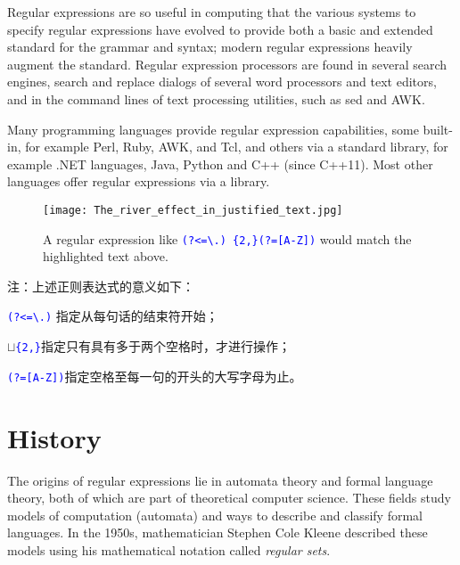 Regular expressions are so useful in computing that the various systems to specify regular expressions have evolved to provide both a basic and extended standard for the grammar and syntax; modern regular expressions heavily augment the standard. Regular expression processors are found in several search engines, search and replace dialogs of several word processors and text editors, and in the command lines of text processing utilities, such as sed and AWK.

Many programming languages provide regular expression capabilities, some built-in, for example Perl, Ruby, AWK, and Tcl, and others via a standard library, for example .NET languages, Java, Python and C++ (since C++11). Most other languages offer regular expressions via a library.


\begin{figure}[!ht]
\centering
\texttt{[image: The\_river\_effect\_in\_justified\_text.jpg]}
\vspace{-20pt}
\caption{\small{A regular expression like \textcolor{Blue}{\texttt{(?<=\textbackslash.) \{2,\}(?=[A-Z])}} would match the highlighted text above.}}
\label{regexp_example}
\end{figure}

注：上述正则表达式的意义如下：

\begin{compactenum}
\item \textcolor{Blue}{\texttt{(?<=\textbackslash.)}} 指定从每句话的结束符开始；
\item $\sqcup$\textcolor{Blue}{\texttt{\{2,\}}}指定只有具有多于两个空格时，才进行操作；
\item \textcolor{Blue}{\texttt{(?=[A-Z])}}指定空格至每一句的开头的大写字母为止。
\end{compactenum}



\chapter{History}


The origins of regular expressions lie in automata theory and formal language theory, both of which are part of theoretical computer science. These fields study models of computation (automata) and ways to describe and classify formal languages. In the 1950s, mathematician Stephen Cole Kleene described these models using his mathematical notation called \textsl{regular sets}. 

